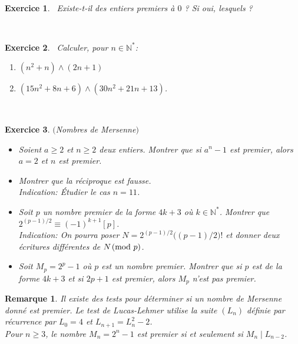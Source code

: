 \documentclass[11pt,a4paper]{article}
\newtheorem{ex}{Exercice}
\newtheorem*{rem}{Remarque}
\begin{document}
\
\begin{ex}\
Existe-t-il des entiers premiers à $0$ ? Si oui, lesquels ?
\end{ex}


\


\begin{comment}
\begin{ex}\
On suppose qu'on dispose d'un algorithme de test de primalité TestPrim$($n$)$ qui renvoie vrai si $n$ est premier et faux sinon. A partir de cet algorithme, écrire un algorithme PreSui$($n$)$ qui, à partir d'un entier naturel $n$, renvoie le plus petit nombre premier strictement supérieur à $n$.
\end{ex}

\
\end{comment}

\begin{ex}\label{exPGCD_Polynomes}\
Calculer, pour $n \in \mathbb{N}^*$:
\begin{enumerate}
\item $ (n^2+n) \wedge (2n+1)$
\item $(15n^2+8n+6)\wedge (30 n^2+21n+13)$.
\end{enumerate}
\end{ex}


\


\begin{ex}\label{exNombres_Mersenne}$($Nombres de Mersenne$)$
\begin{itemize}
\item[$1.$] Soient $a \geqslant 2$ et $n \geqslant 2$ deux entiers. Montrer que si $a^n-1$ est premier, alors $a=2$ et $n$ est premier. 
\item[$2.$] Montrer que la réciproque est fausse.\\
\textit{Indication: Étudier le cas $n=11$.}
\item[$3.$] Soit $p$ un nombre premier de la forme $4k+3$ où $k \in \mathbb{N}^*$. Montrer que $2^{(p-1)/2}\equiv (-1)^{k+1}[p]$.\\
\textit{Indication: On pourra poser $N=2^{(p-1)/2}\big( (p-1)/2 \big)!$ et donner deux écritures différentes de $N \! \! \pmod p$. }
\item[$4.$] Soit $M_p=2^p-1$ où $p$ est un nombre premier. Montrer que si $p$ est de la forme $4k+3$ et si $2p+1$ est premier, alors $M_p$ n'est pas premier.  
\end{itemize}

\end{ex}


\begin{rem}
Il existe des tests pour déterminer si un nombre de Mersenne donné est premier. Le test de Lucas-Lehmer utilise la suite $(L_n)$ définie par récurrence par $L_0=4$ et $L_{n+1}=L_n^2-2$.\\
Pour $n \geqslant 3$, le nombre $M_n= 2^n -1$ est premier si et seulement si $M_n \mid L_{n-2}$. 
\end{rem}
\end{document}
